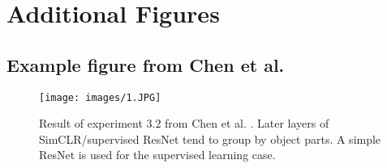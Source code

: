 \newpage
\appendix





\section{Additional Figures}

\subsection{Example figure from Chen et al. \cite{chen2021intriguing}}
\label{appendix:old}

\begin{figure}[H]
        \centering
        \texttt{[image: images/1.JPG]}
        \caption{Result of experiment 3.2 from Chen et al. \cite{chen2021intriguing}. Later
            layers of SimCLR/supervised ResNet tend to group by object parts. A simple ResNet is used for the supervised learning case.}
        \label{fig:orig_paper}
    \end{figure}

